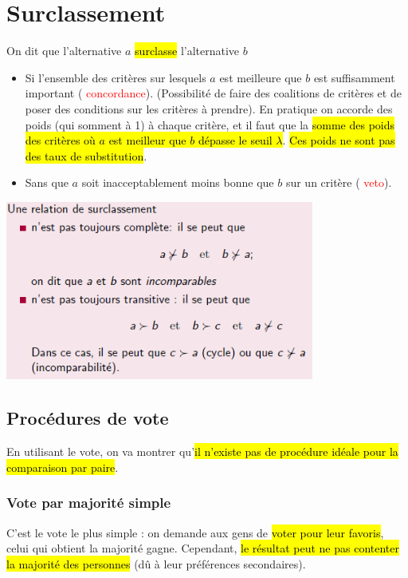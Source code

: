 \documentclass[a4paper, 12pt]{article}
\newcommand{\alinea}{
\hspace*{0.5cm}}
\newcommand{\red}[1]{
	\textcolor{red}{#1}}
\begin{document}
\section{Surclassement}
	\alinea On dit que l'alternative $a$ \red{\hl{surclasse}} l'alternative $b$
	\begin{itemize}
		\setlength\itemsep{0cm}
		\item Si l'ensemble des critères sur lesquels $a$ est meilleure que $b$ est suffisamment important (\red{concordance}). 
			(Possibilité de faire des coalitions de critères et de poser des conditions sur les critères à prendre).
			En pratique on accorde des poids (qui somment à 1) à chaque critère, et il faut que la \hl{somme des poids des critères où $a$
			est meilleur que $b$ dépasse le seuil $\lambda$}. \hl{Ces poids ne sont pas des taux de substitution}.
		\item Sans que $a$ soit inacceptablement moins bonne que $b$ sur un critère (\red{veto}).
	\end{itemize}
	\begin{center}
		\includegraphics[width=4in]{Images/surclassement}
	\end{center}
	\subsection{Procédures de vote}
		\alinea En utilisant le vote, on va montrer qu'\hl{il n'existe pas de procédure idéale pour la comparaison par paire}.
		\subsubsection{Vote par majorité simple}
			\alinea C'est le vote le plus simple : on demande aux gens de \hl{voter pour leur favoris}, celui qui obtient la majorité
				gagne. Cependant, \hl{le résultat peut ne pas contenter la majorité des personnes} (dû à leur préférences secondaires).
\end{document}
